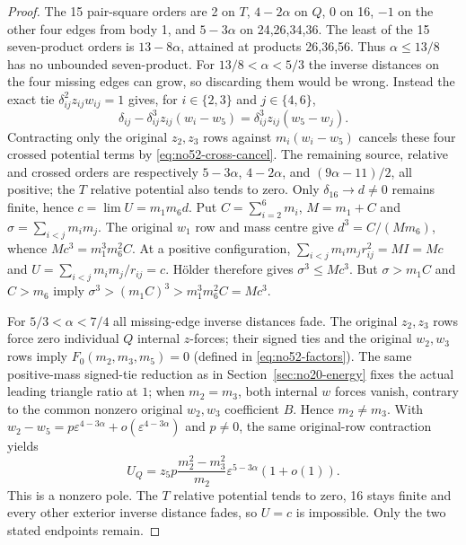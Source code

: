 \documentclass[11pt]{amsart}
\theoremstyle{remark}
\begin{document}
\begin{proof}
The 15 pair-square orders are 2 on $T$, $4-2\alpha$ on $Q$, 0 on 16, $-1$ on the other four edges from body 1, and $5-3\alpha$ on 24,26,34,36. The least of the 15 seven-product orders is $13-8\alpha$, attained at products 26,36,56. Thus $\alpha\le13/8$ has no unbounded seven-product. For $13/8<\alpha<5/3$ the inverse distances on the four missing edges can grow, so discarding them would be wrong. Instead the exact tie $\delta_{ij}^2z_{ij}w_{ij}=1$ gives, for $i\in\{2,3\}$ and $j\in\{4,6\}$,
\begin{equation}\label{eq:no52-cross-cancel}
\delta_{ij}-\delta_{ij}^3z_{ij}(w_i-w_5)=\delta_{ij}^3z_{ij}(w_5-w_j).
\end{equation}
Contracting only the original $z_2,z_3$ rows against $m_i(w_i-w_5)$ cancels these four crossed potential terms by \eqref{eq:no52-cross-cancel}. The remaining source, relative and crossed orders are respectively $5-3\alpha$, $4-2\alpha$, and $(9\alpha-11)/2$, all positive; the $T$ relative potential also tends to zero. Only $\delta_{16}\to d\ne0$ remains finite, hence $c=\lim U=m_1m_6d$. Put $C=\sum_{i=2}^6m_i$, $M=m_1+C$ and $\sigma=\sum_{i<j}m_im_j$. The original $w_1$ row and mass centre give $d^3=C/(Mm_6)$, whence $Mc^3=m_1^3m_6^2C$. At a positive configuration, $\sum_{i<j}m_im_jr_{ij}^2=MI=Mc$ and $U=\sum_{i<j}m_im_j/r_{ij}=c$. H\"older therefore gives $\sigma^3\le Mc^3$. But $\sigma>m_1C$ and $C>m_6$ imply $\sigma^3>(m_1C)^3>m_1^3m_6^2C=Mc^3$.

For $5/3<\alpha<7/4$ all missing-edge inverse distances fade. The original $z_2,z_3$ rows force zero individual $Q$ internal $z$-forces; their signed ties and the original $w_2,w_3$ rows imply $F_0(m_2,m_3,m_5)=0$ (defined in \eqref{eq:no52-factors}). The same positive-mass signed-tie reduction as in Section~\ref{sec:no20-energy} fixes the actual leading triangle ratio at $1$; when $m_2=m_3$, both internal $w$ forces vanish, contrary to the common nonzero original $w_2,w_3$ coefficient $B$. Hence $m_2\ne m_3$. With $w_2-w_5=p\varepsilon^{4-3\alpha}+o(\varepsilon^{4-3\alpha})$ and $p\ne0$, the same original-row contraction yields
\begin{equation}\label{eq:no52-q-pole}
U_Q=z_5p\frac{m_2^2-m_3^2}{m_2}\varepsilon^{5-3\alpha}(1+o(1)).
\end{equation}
This is a nonzero pole. The $T$ relative potential tends to zero, 16 stays finite and every other exterior inverse distance fades, so $U=c$ is impossible. Only the two stated endpoints remain.
\end{proof}
\end{document}
